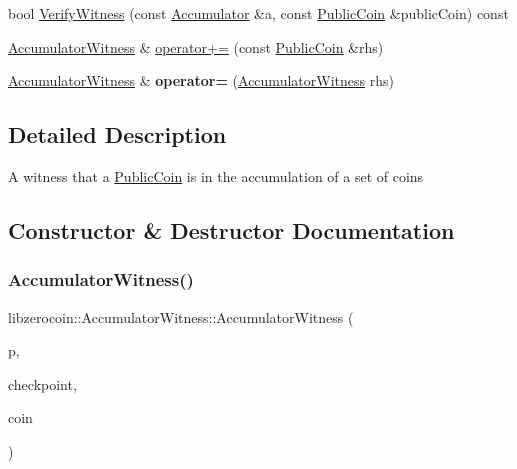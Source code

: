 \begin{DoxyCompactItemize}
\item 
bool \mbox{\hyperlink{classlibzerocoin_1_1_accumulator_witness_a76ce479fd510ed04d78c821cdb2a37bd}{Verify\+Witness}} (const \mbox{\hyperlink{classlibzerocoin_1_1_accumulator}{Accumulator}} \&a, const \mbox{\hyperlink{classlibzerocoin_1_1_public_coin}{Public\+Coin}} \&public\+Coin) const
\item 
\mbox{\hyperlink{classlibzerocoin_1_1_accumulator_witness}{Accumulator\+Witness}} \& \mbox{\hyperlink{classlibzerocoin_1_1_accumulator_witness_a57de1414fbb80e5259a76e70b4baa28e}{operator+=}} (const \mbox{\hyperlink{classlibzerocoin_1_1_public_coin}{Public\+Coin}} \&rhs)
\item 
\mbox{\label{classlibzerocoin_1_1_accumulator_witness_abf74598e2b7b1db65aaf0ad27d325daa}} 
\mbox{\hyperlink{classlibzerocoin_1_1_accumulator_witness}{Accumulator\+Witness}} \& {\bfseries operator=} (\mbox{\hyperlink{classlibzerocoin_1_1_accumulator_witness}{Accumulator\+Witness}} rhs)
\end{DoxyCompactItemize}


\subsection{Detailed Description}
A witness that a \mbox{\hyperlink{classlibzerocoin_1_1_public_coin}{Public\+Coin}} is in the accumulation of a set of coins 

\subsection{Constructor \& Destructor Documentation}
\mbox{\label{classlibzerocoin_1_1_accumulator_witness_af1abca6db569d151f4b416221f28d18e}} 
\subsubsection{\texorpdfstring{Accumulator\+Witness()}{AccumulatorWitness()}}
{\footnotesize\ttfamily libzerocoin\+::\+Accumulator\+Witness\+::\+Accumulator\+Witness (\begin{DoxyParamCaption}\item[{const \mbox{\hyperlink{classlibzerocoin_1_1_zerocoin_params}{Zerocoin\+Params}} $\ast$}]{p,  }\item[{const \mbox{\hyperlink{classlibzerocoin_1_1_accumulator}{Accumulator}} \&}]{checkpoint,  }\item[{const \mbox{\hyperlink{classlibzerocoin_1_1_public_coin}{Public\+Coin}}}]{coin }\end{DoxyParamCaption})}

